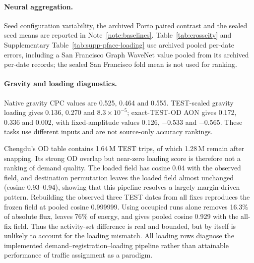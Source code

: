 \paragraph{Neural aggregation.} Seed configuration variability, the archived Porto paired contrast and the sealed seed means are reported in Note~\ref{note:baselines}. Table~\ref{tab:crosscity} and Supplementary Table~\ref{tab:supp-pface-loading} use archived pooled per-date errors, including a San Francisco Graph WaveNet value pooled from its archived per-date records; the sealed San Francisco fold mean is not used for ranking.

\paragraph{Gravity and loading diagnostics.} Native gravity CPC values are 0.525, 0.464 and 0.555. TEST-scaled gravity loading gives 0.136, 0.270 and $8.3\times10^{-5}$; exact-TEST-OD AON gives 0.172, 0.336 and 0.002, with fixed-amplitude values 0.126, $-0.533$ and $-0.565$. These tasks use different inputs and are not source-only accuracy rankings.

Chengdu's OD table contains 1.64\,M TEST trips, of which 1.28\,M remain after snapping. Its strong OD overlap but near-zero loading score is therefore not a ranking of demand quality. The loaded field has cosine 0.04 with the observed field, and destination permutation leaves the loaded field almost unchanged (cosine 0.93--0.94), showing that this pipeline resolves a largely margin-driven pattern. Rebuilding the observed three TEST dates from all fixes reproduces the frozen field at pooled cosine 0.999999. Using occupied runs alone removes 16.3\% of absolute flux, leaves 76\% of energy, and gives pooled cosine 0.929 with the all-fix field. Thus the activity-set difference is real and bounded, but by itself is unlikely to account for the loading mismatch. All loading rows diagnose the implemented demand--registration--loading pipeline rather than attainable performance of traffic assignment as a paradigm.
